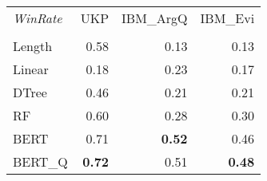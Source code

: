 \begin{tabular}{lrrr}
\toprule
\textit{WinRate} &   UKP &  IBM\_ArgQ &  IBM\_Evi \\
  &       &           &          \\
\midrule
Length &  0.58 &      0.13 &     0.13 \\
Linear &  0.18 &      0.23 &     0.17 \\
DTree  &  0.46 &      0.21 &     0.21 \\
RF     &  0.60 &      0.28 &     0.30 \\
BERT   &  0.71 &      \textbf{0.52} &     0.46 \\
BERT\_Q &  \textbf{0.72} &      0.51 &     \textbf{0.48} \\
\bottomrule
\end{tabular}
